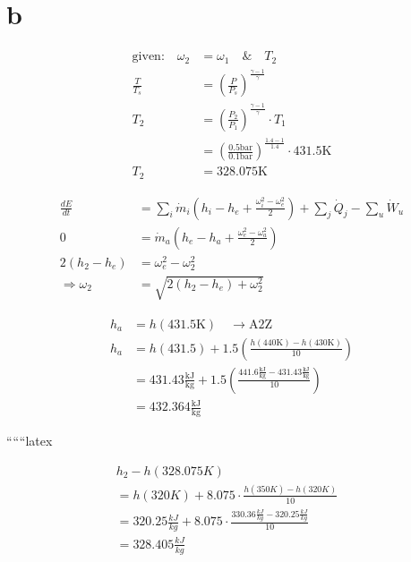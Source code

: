 

\section*{b}

\begin{align*}
    \text{given:} \quad \omega_2 &= \omega_1 \quad \& \quad T_2 \\
    \frac{T}{T_s} &= \left( \frac{P}{P_s} \right)^{\frac{\gamma-1}{\gamma}} \\
    T_2 &= \left( \frac{P_2}{P_1} \right)^{\frac{\gamma-1}{\gamma}} \cdot T_1 \\
    &= \left( \frac{0.5 \text{bar}}{0.1 \text{bar}} \right)^{\frac{1.4-1}{1.4}} \cdot 431.5 \text{K} \\
    T_2 &= 328.075 \text{K}
\end{align*}

\begin{align*}
    \frac{dE}{dt} &= \sum_i \dot{m}_i \left( h_i - h_e + \frac{\omega_i^2 - \omega_e^2}{2} \right) + \sum_j \dot{Q}_j - \sum_u \dot{W}_u \\
    0 &= \dot{m}_a \left( h_e - h_a + \frac{\omega_e^2 - \omega_a^2}{2} \right) \\
    2(h_2 - h_e) &= \omega_e^2 - \omega_2^2 \\
    \Rightarrow \omega_2 &= \sqrt{2(h_2 - h_e) + \omega_2^2}
\end{align*}

\begin{align*}
    h_a &= h \left( 431.5 \text{K} \right) \quad \rightarrow \text{A2Z} \\
    h_a &= h(431.5) + 1.5 \left( \frac{h(440 \text{K}) - h(430 \text{K})}{10} \right) \\
    &= 431.43 \frac{\text{kJ}}{\text{kg}} + 1.5 \left( \frac{441.6 \frac{\text{kJ}}{\text{kg}} - 431.43 \frac{\text{kJ}}{\text{kg}}}{10} \right) \\
    &= 432.364 \frac{\text{kJ}}{\text{kg}}
\end{align*}

``````latex

\begin{align*}
h_2 - h(328.075K) & \\
= h(320K) + 8.075 \cdot \frac{h(350K) - h(320K)}{10} & \\
= 320.25 \frac{kJ}{kg} + 8.075 \cdot \frac{330.36 \frac{kJ}{kg} - 320.25 \frac{kJ}{kg}}{10} & \\
= 328.405 \frac{kJ}{kg} &
\end{align*}

